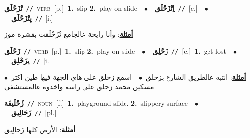 \documentclass[10pt,a4paper,twoside]{article} %
\begin{document}
\begin{multicols}{2}
{\setlength\topsep{0pt}\textbf{\foreignlanguage{arabic}{تْزَحْلَق}}\ {\color{gray}\texttt{//}\color{black}}\ \textsc{verb}\ [p.]\ \textbf{1.}~slip  \textbf{2.}~play on slide\ \ $\bullet$\ \ \setlength\topsep{0pt}\textbf{\foreignlanguage{arabic}{اِتْزَحْلَق}}\ {\color{gray}\texttt{//}\color{black}}\ [c.]\ \ $\bullet$\ \ \setlength\topsep{0pt}\textbf{\foreignlanguage{arabic}{يِتْزَحْلَق}}\ {\color{gray}\texttt{//}\color{black}}\ [i.]\  \begin{flushright}\color{gray}\foreignlanguage{arabic}{\textbf{\underline{\foreignlanguage{arabic}{أمثلة}}}: وأنا رايحة عالجامع تْزَحْلَقت بقشرة موز}\end{flushright}\color{black}} \vspace{2mm}

{\setlength\topsep{0pt}\textbf{\foreignlanguage{arabic}{زَحْلَق}}\ {\color{gray}\texttt{//}\color{black}}\ \textsc{verb}\ [p.]\ \textbf{1.}~slip  \textbf{2.}~play on slide\ \ $\bullet$\ \ \setlength\topsep{0pt}\textbf{\foreignlanguage{arabic}{زَحْلِق}}\ {\color{gray}\texttt{//}\color{black}}\ [c.]\ \textbf{1.}~get lost\ \ $\bullet$\ \ \setlength\topsep{0pt}\textbf{\foreignlanguage{arabic}{يزَحْلِق}}\ {\color{gray}\texttt{//}\color{black}}\ [i.]\  \begin{flushright}\color{gray}\foreignlanguage{arabic}{\textbf{\underline{\foreignlanguage{arabic}{أمثلة}}}: انتبه عالطريق الشارع بزحلق\ $\bullet$\ \  اسمع زحلق على هاي الجهة فيها طين اكتر\ $\bullet$\ \  مسكين محمد زحلق على راسه واخدوه عالمستشفى}\end{flushright}\color{black}} \vspace{2mm}

{\setlength\topsep{0pt}\textbf{\foreignlanguage{arabic}{زُحْلَيقَة}}\ {\color{gray}\texttt{//}\color{black}}\ \textsc{noun}\ [f.]\ \textbf{1.}~playground slide.  \textbf{2.}~slippery surface\ \ $\bullet$\ \ \setlength\topsep{0pt}\textbf{\foreignlanguage{arabic}{زَحَالِيق}}\ {\color{gray}\texttt{//}\color{black}}\ [pl.]\  \begin{flushright}\color{gray}\foreignlanguage{arabic}{\textbf{\underline{\foreignlanguage{arabic}{أمثلة}}}: الأرض كلها زَحالِيق}\end{flushright}\color{black}} \vspace{2mm}


\end{multicols}
\end{document}
